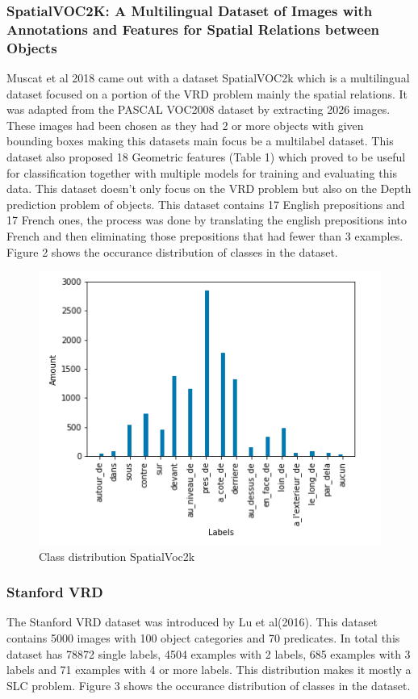 \documentclass{csfyp}
\begin{document}
\subsubsection{SpatialVOC2K: A Multilingual Dataset of Images with Annotations and Features for Spatial Relations between Objects}
Muscat et al 2018 came out with a dataset SpatialVOC2k which is a multilingual dataset focused on a portion of the VRD problem mainly the spatial relations. It was adapted from the PASCAL VOC2008 dataset by extracting 2026 images. These images had been chosen as they had 2 or more objects with given bounding boxes making this datasets main focus be a multilabel dataset. This dataset also proposed 18 Geometric features (Table 1) which proved to be useful for classification together with multiple models for training and evaluating this data. This dataset doesn’t only focus on the VRD problem but also on the Depth prediction problem of objects. This dataset contains 17 English prepositions and 17 French ones, the process was done by translating the english prepositions into French and then eliminating those prepositions that had fewer than 3 examples. Figure 2 shows the occurance distribution of classes in the dataset.

\begin{figure}[!htbp]
	\includegraphics[scale=0.60,center]{SV2k.pdf}
	\caption{Class distribution SpatialVoc2k}
\end{figure}

\subsubsection{Stanford VRD}
The Stanford VRD dataset was introduced by Lu et al(2016). This dataset contains 5000 images with 100 object categories and 70 predicates. In total this dataset has 78872 single labels, 4504 examples with 2 labels,
685 examples with 3 labels and 71 examples with 4 or more labels. This distribution makes it mostly a SLC problem. Figure 3 shows the occurance distribution of classes in the dataset.
\end{document}
